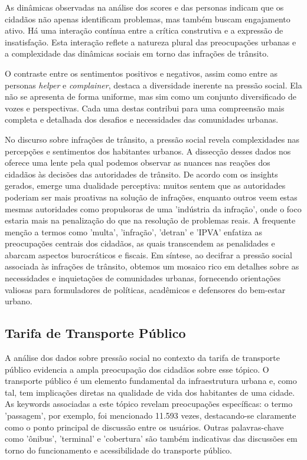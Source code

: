 As dinâmicas observadas na análise dos scores e das personas indicam que os cidadãos não apenas identificam problemas, mas também buscam engajamento ativo. Há uma interação contínua entre a crítica construtiva e a expressão de insatisfação. Esta interação reflete a natureza plural das preocupações urbanas e a complexidade das dinâmicas sociais em torno das infrações de trânsito.

O contraste entre os sentimentos positivos e negativos, assim como entre as personas \textit{helper} e \textit{complainer}, destaca a diversidade inerente na pressão social. Ela não se apresenta de forma uniforme, mas sim como um conjunto diversificado de vozes e perspectivas. Cada uma destas contribui para uma compreensão mais completa e detalhada dos desafios e necessidades das comunidades urbanas.

No discurso sobre infrações de trânsito, a pressão social revela complexidades nas percepções e sentimentos dos habitantes urbanos. A dissecção desses dados nos oferece uma lente pela qual podemos observar as nuances nas reações dos cidadãos às decisões das autoridades de trânsito. De acordo com os insights gerados, emerge uma dualidade perceptiva: muitos sentem que as autoridades poderiam ser mais proativas na solução de infrações, enquanto outros veem estas mesmas autoridades como propulsoras de uma 'indústria da infração', onde o foco estaria mais na penalização do que na resolução de problemas reais. A frequente menção a termos como 'multa', 'infração', 'detran' e 'IPVA' enfatiza as preocupações centrais dos cidadãos, as quais transcendem as penalidades e abarcam aspectos burocráticos e fiscais. Em síntese, ao decifrar a pressão social associada às infrações de trânsito, obtemos um mosaico rico em detalhes sobre as necessidades e inquietações de comunidades urbanas, fornecendo orientações valiosas para formuladores de políticas, acadêmicos e defensores do bem-estar urbano.

\subsection{Tarifa de Transporte Público}

A análise dos dados sobre pressão social no contexto da tarifa de transporte público evidencia a ampla preocupação dos cidadãos sobre esse tópico. O transporte público é um elemento fundamental da infraestrutura urbana e, como tal, tem implicações diretas na qualidade de vida dos habitantes de uma cidade. As keywords associadas a este tópico revelam preocupações específicas: o termo 'passagem', por exemplo, foi mencionado 11.593 vezes, destacando-se claramente como o ponto principal de discussão entre os usuários. Outras palavras-chave como 'ônibus', 'terminal' e 'cobertura' são também indicativas das discussões em torno do funcionamento e acessibilidade do transporte público.

